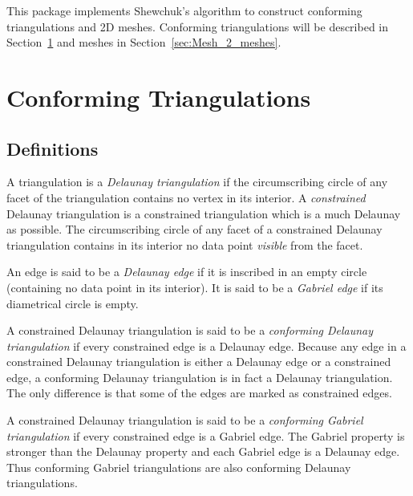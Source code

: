 \label{user_chapter_2D_Meshes}



\minitoc

This package implements Shewchuk's algorithm \cite{s-mgdsa-00} to construct
conforming triangulations and 2D meshes. Conforming triangulations will be
described in Section~\ref{sec:Mesh_2_conforming_triangulation} and
meshes in Section~\ref{sec:Mesh_2_meshes}.

\section{Conforming Triangulations}
\label{sec:Mesh_2_conforming_triangulation}

\subsection{Definitions}
\label{sec:Mesh_2_conforming_definitions}

A triangulation is a \emph{Delaunay triangulation} if the circumscribing
circle of any facet of the triangulation contains no vertex in its
interior. A \emph{constrained} Delaunay triangulation is a constrained
triangulation which is a much Delaunay as possible. The circumscribing
circle of any facet of a constrained Delaunay triangulation contains in its
interior no data point \emph{visible} from the facet.

An edge is said to be a \emph{Delaunay edge} if it is inscribed in an empty
circle (containing no data point in its interior). It is said to be a
\emph{Gabriel edge} if its diametrical circle is empty.

A constrained Delaunay triangulation is said to be a \emph{conforming
  Delaunay triangulation} if every constrained edge is a Delaunay edge.
Because any edge in a constrained Delaunay triangulation is either a
Delaunay edge or a constrained edge, a conforming Delaunay triangulation is
in fact a Delaunay triangulation. The only difference is that some of the
edges are marked as constrained edges.

A constrained Delaunay triangulation is said to be a \emph{conforming
  Gabriel triangulation} if every constrained edge is a Gabriel edge. The
Gabriel property is stronger than the Delaunay property and each Gabriel
edge is a Delaunay edge. Thus conforming Gabriel triangulations are also
conforming Delaunay triangulations.

